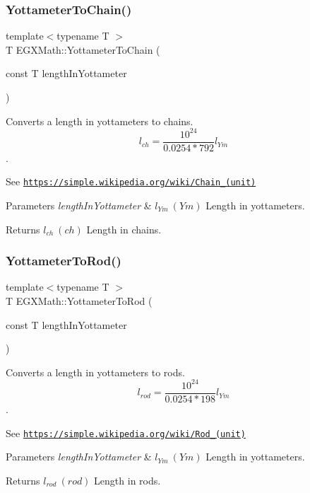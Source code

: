 \subsubsection{\texorpdfstring{Yottameter\+To\+Chain()}{YottameterToChain()}}
{\footnotesize\ttfamily template$<$typename T $>$ \\
T E\+G\+X\+Math\+::\+Yottameter\+To\+Chain (\begin{DoxyParamCaption}\item[{const T}]{length\+In\+Yottameter }\end{DoxyParamCaption})}



Converts a length in yottameters to chains. \[ l_{ch}= \frac{10^{24}}{0.0254 * 792} l_{Ym} \]. 

See \href{https://simple.wikipedia.org/wiki/Chain_(unit)}{\tt https\+://simple.\+wikipedia.\+org/wiki/\+Chain\+\_\+(unit)} 
\begin{DoxyParams}{Parameters}
{\em length\+In\+Yottameter} & $ l_{Ym}\ (Ym)$ Length in yottameters. \\
\hline
\end{DoxyParams}
\begin{DoxyReturn}{Returns}
$ l_{ch}\ (ch)$ Length in chains. 
\end{DoxyReturn}
\mbox{\label{group___e_g_x_math-_conversions-_length_conversions-_s_i-_yottameter-_surveyors_ga877c3000c23a08dc1bcd3c4359482356}} 
\subsubsection{\texorpdfstring{Yottameter\+To\+Rod()}{YottameterToRod()}}
{\footnotesize\ttfamily template$<$typename T $>$ \\
T E\+G\+X\+Math\+::\+Yottameter\+To\+Rod (\begin{DoxyParamCaption}\item[{const T}]{length\+In\+Yottameter }\end{DoxyParamCaption})}



Converts a length in yottameters to rods. \[ l_{rod}= \frac{10^{24}}{0.0254 * 198} l_{Ym} \]. 

See \href{https://simple.wikipedia.org/wiki/Rod_(unit)}{\tt https\+://simple.\+wikipedia.\+org/wiki/\+Rod\+\_\+(unit)} 
\begin{DoxyParams}{Parameters}
{\em length\+In\+Yottameter} & $ l_{Ym}\ (Ym)$ Length in yottameters. \\
\hline
\end{DoxyParams}
\begin{DoxyReturn}{Returns}
$ l_{rod}\ (rod)$ Length in rods. 
\end{DoxyReturn}
